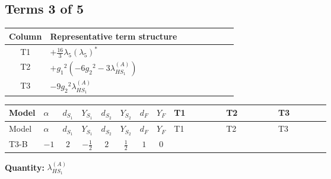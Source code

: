 \documentclass[8pt]{article}
\begin{document}
\begin{landscape}
\subsection*{Terms 3 of 5}
\begin{center}
\begin{tabular}{@{}c >{\raggedright\arraybackslash}p{0.82\linewidth}@{}}
\toprule
Column & Representative term structure \\
\midrule
T1 & \(\displaystyle +\frac{16}{3} {\lambda_5} \left({\lambda_5}\right)^{*}\) \\
\midrule
T2 & \(\displaystyle +{g_1}^2 \left(-6 {g_2}^2-3 {\lambda_{HS_1}^{(A)}}\right)\) \\
\midrule
T3 & \(\displaystyle -9 {g_2}^2 {\lambda_{HS_1}^{(A)}}\) \\
\midrule
\bottomrule
\end{tabular}
\end{center}
\smallskip
\tiny
\begin{longtable}{@{}llcccccc >{\raggedright\arraybackslash}p{0.21\linewidth} >{\raggedright\arraybackslash}p{0.21\linewidth} >{\raggedright\arraybackslash}p{0.21\linewidth}@{}}
\toprule
Model & $\alpha$ & $d_{S_1}$ & $Y_{S_1}$ & $d_{S_2}$ & $Y_{S_2}$ & $d_F$ & $Y_F$ & T1 & T2 & T3 \\
\midrule
\endfirsthead
\toprule
Model & $\alpha$ & $d_{S_1}$ & $Y_{S_1}$ & $d_{S_2}$ & $Y_{S_2}$ & $d_F$ & $Y_F$ & T1 & T2 & T3 \\
\midrule
\endhead
T3-B & $-1$ & $2$ & $-\frac{1}{2}$ & $2$ & $\frac{1}{2}$ & $1$ & $0$ & \scriptsize\adjustbox{max width=\linewidth}{$\begin{gathered} +\frac{16}{3} {\lambda_5} \left({\lambda_5}\right)^{*}\end{gathered}$} & \scriptsize\adjustbox{max width=\linewidth}{$\begin{gathered} +{g_1}^2 \left(-6 {g_2}^2-3 {\lambda_{HS_1}^{(A)}}\right)\end{gathered}$} & \scriptsize\adjustbox{max width=\linewidth}{$\begin{gathered} -9 {g_2}^2 {\lambda_{HS_1}^{(A)}}\end{gathered}$} \\
\midrule
\bottomrule
\end{longtable}
\clearpage
\noindent\textbf{Quantity: }$\lambda_{HS_1}^{(A)}$\par\smallskip

\end{landscape}
\end{document}
